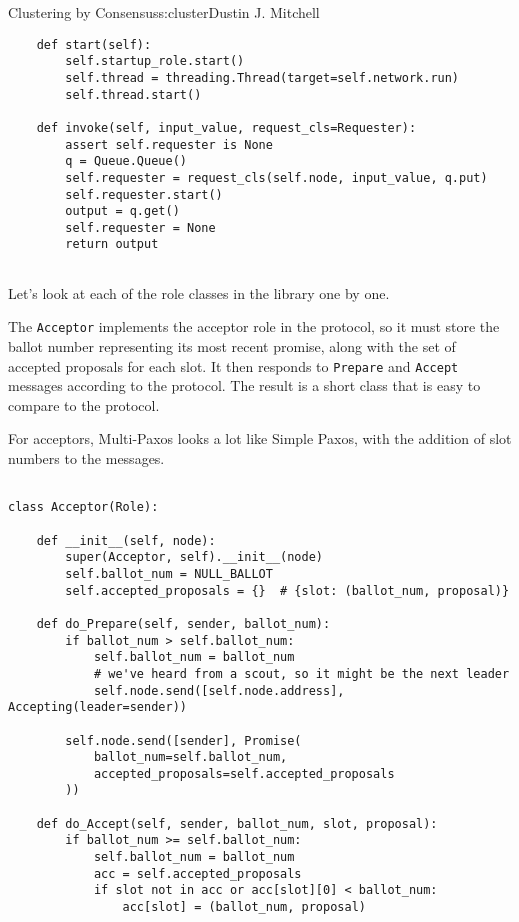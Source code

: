 \begin{aosachapter}{Clustering by Consensus}{s:cluster}{Dustin J. Mitchell}
\begin{verbatim}
    def start(self):
        self.startup_role.start()
        self.thread = threading.Thread(target=self.network.run)
        self.thread.start()

    def invoke(self, input_value, request_cls=Requester):
        assert self.requester is None
        q = Queue.Queue()
        self.requester = request_cls(self.node, input_value, q.put)
        self.requester.start()
        output = q.get()
        self.requester = None
        return output
    
\end{verbatim}

\label{role-classes}

Let's look at each of the role classes in the library one by one.

\label{acceptor}

The \texttt{Acceptor} implements the acceptor role in the protocol, so
it must store the ballot number representing its most recent promise,
along with the set of accepted proposals for each slot. It then responds
to \texttt{Prepare} and \texttt{Accept} messages according to the
protocol. The result is a short class that is easy to compare to the
protocol.

For acceptors, Multi-Paxos looks a lot like Simple Paxos, with the
addition of slot numbers to the messages.

\begin{verbatim}

class Acceptor(Role):

    def __init__(self, node):
        super(Acceptor, self).__init__(node)
        self.ballot_num = NULL_BALLOT
        self.accepted_proposals = {}  # {slot: (ballot_num, proposal)}

    def do_Prepare(self, sender, ballot_num):
        if ballot_num > self.ballot_num:
            self.ballot_num = ballot_num
            # we've heard from a scout, so it might be the next leader
            self.node.send([self.node.address], Accepting(leader=sender))

        self.node.send([sender], Promise(
            ballot_num=self.ballot_num, 
            accepted_proposals=self.accepted_proposals
        ))

    def do_Accept(self, sender, ballot_num, slot, proposal):
        if ballot_num >= self.ballot_num:
            self.ballot_num = ballot_num
            acc = self.accepted_proposals
            if slot not in acc or acc[slot][0] < ballot_num:
                acc[slot] = (ballot_num, proposal)


\end{verbatim}
\end{aosachapter}
